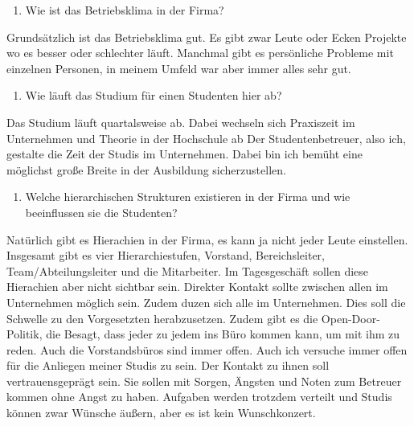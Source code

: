 \documentclass[
  12pt,
  ngerman,
  a4paper,
]{article}
\providecommand{\tightlist}{%
  \setlength{\itemsep}{0pt}\setlength{\parskip}{0pt}}
\begin{document}
\begin{enumerate}
\def\labelenumi{\arabic{enumi}.}
\setcounter{enumi}{1}
\tightlist
\item
  Wie ist das Betriebsklima in der Firma?
\end{enumerate}

Grundsätzlich ist das Betriebsklima gut. Es gibt zwar Leute oder Ecken
Projekte wo es besser oder schlechter läuft. Manchmal gibt es
persönliche Probleme mit einzelnen Personen, in meinem Umfeld war aber
immer alles sehr gut.

\begin{enumerate}
\def\labelenumi{\arabic{enumi}.}
\setcounter{enumi}{2}
\tightlist
\item
  Wie läuft das Studium für einen Studenten hier ab?
\end{enumerate}

Das Studium läuft quartalsweise ab. Dabei wechseln sich Praxiszeit im
Unternehmen und Theorie in der Hochschule ab Der Studentenbetreuer, also
ich, gestalte die Zeit der Studis im Unternehmen. Dabei bin ich bemüht
eine möglichst große Breite in der Ausbildung sicherzustellen.

\begin{enumerate}
\def\labelenumi{\arabic{enumi}.}
\setcounter{enumi}{3}
\tightlist
\item
  Welche hierarchischen Strukturen existieren in der Firma und wie
  beeinflussen sie die Studenten?
\end{enumerate}

Natürlich gibt es Hierachien in der Firma, es kann ja nicht jeder Leute
einstellen. Insgesamt gibt es vier Hierarchiestufen, Vorstand,
Bereichsleiter, Team/Abteilungsleiter und die Mitarbeiter. Im
Tagesgeschäft sollen diese Hierachien aber nicht sichtbar sein. Direkter
Kontakt sollte zwischen allen im Unternehmen möglich sein. Zudem duzen
sich alle im Unternehmen. Dies soll die Schwelle zu den Vorgesetzten
herabzusetzen. Zudem gibt es die Open-Door-Politik, die Besagt, dass
jeder zu jedem ins Büro kommen kann, um mit ihm zu reden. Auch die
Vorstandsbüros sind immer offen. Auch ich versuche immer offen für die
Anliegen meiner Studis zu sein. Der Kontakt zu ihnen soll
vertrauensgeprägt sein. Sie sollen mit Sorgen, Ängsten und Noten zum
Betreuer kommen ohne Angst zu haben. Aufgaben werden trotzdem verteilt
und Studis können zwar Wünsche äußern, aber es ist kein Wunschkonzert.
\end{document}
